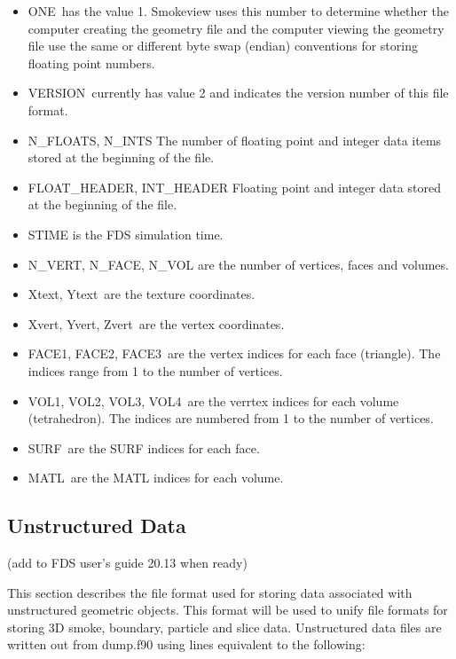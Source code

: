 \documentclass[12pt]{article}
\begin{document}
\begin{itemize}
\item {\ct ONE}\ has the value 1. Smokeview uses this number to determine whether the computer creating the geometry file and the computer viewing the geometry file use the same or different byte swap (endian) conventions for storing floating point numbers.
\item {\ct VERSION}\ currently has value 2 and indicates the version number of this file format.
\item {\ct N\_FLOATS, N\_INTS} The number of floating point and integer data items stored at the beginning of the file.
\item {\ct FLOAT\_HEADER, INT\_HEADER} Floating point and integer data stored at the beginning of the file.
\item {\ct STIME} is the FDS simulation time.
\item {\ct N\_VERT, N\_FACE, N\_VOL}  are the number of vertices, faces and volumes.
\item {\ct Xtext, Ytext}\ are the texture coordinates.
\item {\ct Xvert, Yvert, Zvert}\ are the vertex coordinates.
\item {\ct FACE1, FACE2, FACE3}\ are the vertex indices for each face (triangle).
    The indices range from 1 to the
    number of vertices.
\item {\ct VOL1, VOL2, VOL3, VOL4}\ are the verrtex indices for each volume (tetrahedron).  The indices are numbered from 1 to the number of vertices.
\item {\ct SURF}\ are the SURF indices for each face.
\item {\ct MATL}\ are the MATL indices for each volume.
\end{itemize}


\subsection{Unstructured Data}

\label{out:GEOMETRYDATA}

(add to FDS user's guide 20.13 when ready)

This section describes the file format used for
storing data associated with unstructured geometric objects.  This format will be used to unify file formats for storing 3D smoke, boundary, particle and slice data.
Unstructured data files are written out from {\ct dump.f90} using lines equivalent to the following:
\end{document}
